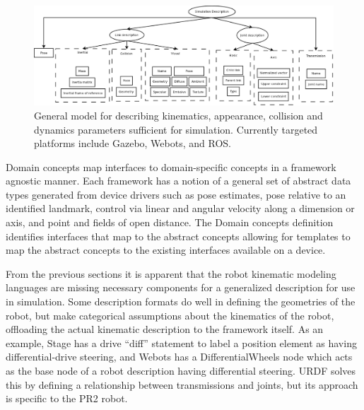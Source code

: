 \begin{figure}[thpb]
      \centering
      \includegraphics[width=6in]{images/kvc.pdf}
      \caption{General model for describing kinematics, appearance, collision and dynamics parameters sufficient for simulation.  Currently targeted platforms include Gazebo, Webots, and ROS.}
      \label{kvc}
\end{figure}

Domain concepts map interfaces to domain-specific concepts in a framework agnostic manner.  Each framework has a notion of a general set of abstract data types generated from device drivers such as pose estimates, pose relative to an identified landmark, control via linear and angular velocity along a dimension or axis, and point and fields of open distance.  The {\sc Domain concepts} definition identifies interfaces that map to the abstract concepts allowing for templates to map the abstract concepts to the existing interfaces available on a device.

From the previous sections it is apparent that the robot kinematic modeling languages are missing necessary components for a generalized description for use in simulation. Some description formats do well in defining the geometries of the robot, but make categorical assumptions about the kinematics of the robot, offloading the actual kinematic description to the framework itself. As an example, Stage has a drive ``diff'' statement to label a position element as having differential-drive steering, and Webots has a DifferentialWheels node which acts as the base node of a robot description having differential steering. URDF solves this by defining a relationship between transmissions and joints, but its approach is specific to the PR2 robot.

